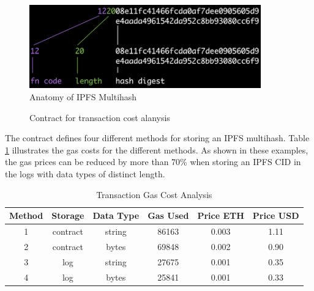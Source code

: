 \begin{figure}[H]
    \centering
    \includegraphics[width=10cm]{images/multihash.jpg}
    \caption{Anatomy of IPFS Multihash\protect\footnotemark}
    \label{img:anatomy-of-ipfs-multihash}
\end{figure}


\newpage
\begin{figure}[H]
    
    \caption{Contract for transaction cost alanysis}
    \label{code:ipfs-storage}
\end{figure}


The contract defines four different methods for storing an IPFS multihash. Table \ref{tab:transaction-gas-cost-analysis} illustrates the gas costs for the different methods. As shown in these examples, the gas prices can be reduced by more than 70\% when storing an IPFS CID in the logs with data types of distinct length.

\begin{table}[ht]
\centering
\begin{tabular}{|c|c|c|c|c|c|}
\hline
\textbf{Method} & \textbf{Storage} & \textbf{Data Type} & \textbf{Gas Used} & \textbf{Price ETH} & \textbf{Price USD} \\ \hline
1               & contract         & string             & 86163             & 0.003              & 1.11               \\ \hline
2               & contract         & bytes              & 69848             & 0.002              & 0.90               \\ \hline
3               & log              & string             & 27675             & 0.001              & 0.35               \\ \hline
4               & log              & bytes              & 25841             & 0.001              & 0.33               \\ \hline
\end{tabular}
\caption{Transaction Gas Cost Analysis}
\label{tab:transaction-gas-cost-analysis}
\end{table}

